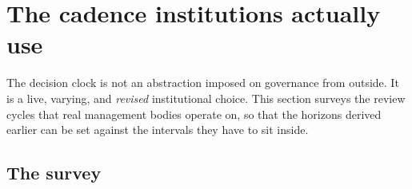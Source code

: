 
\section{The cadence institutions actually use}
\label{sec:cadence}

The decision clock is not an abstraction imposed on governance from outside. It is a live,
varying, and \emph{revised} institutional choice. This section surveys the review cycles
that real management bodies operate on, so that the horizons derived earlier can be set
against the intervals they have to sit inside.

\subsection{The survey}


